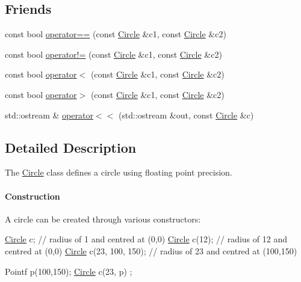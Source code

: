 \subsection*{Friends}
\begin{DoxyCompactItemize}
\item 
const bool \hyperlink{classprism_1_1geometry_1_1_circle_aea4bcef75428f13320f5c8148869d7ac}{operator==} (const \hyperlink{classprism_1_1geometry_1_1_circle}{Circle} \&c1, const \hyperlink{classprism_1_1geometry_1_1_circle}{Circle} \&c2)
\item 
const bool \hyperlink{classprism_1_1geometry_1_1_circle_ac1093de6b8dac6c9df82db5b72148634}{operator!=} (const \hyperlink{classprism_1_1geometry_1_1_circle}{Circle} \&c1, const \hyperlink{classprism_1_1geometry_1_1_circle}{Circle} \&c2)
\item 
const bool \hyperlink{classprism_1_1geometry_1_1_circle_a3aaa7d08426b0e4aa5f51f1839eb3bb1}{operator$<$} (const \hyperlink{classprism_1_1geometry_1_1_circle}{Circle} \&c1, const \hyperlink{classprism_1_1geometry_1_1_circle}{Circle} \&c2)
\item 
const bool \hyperlink{classprism_1_1geometry_1_1_circle_a519af3a911c5ccd13d0c711d0adfef79}{operator$>$} (const \hyperlink{classprism_1_1geometry_1_1_circle}{Circle} \&c1, const \hyperlink{classprism_1_1geometry_1_1_circle}{Circle} \&c2)
\item 
std\+::ostream \& \hyperlink{classprism_1_1geometry_1_1_circle_a4deb656103c2fc1ea9258fc37bfdcc6c}{operator$<$$<$} (std\+::ostream \&out, const \hyperlink{classprism_1_1geometry_1_1_circle}{Circle} \&c)
\end{DoxyCompactItemize}


\subsection{Detailed Description}
The \hyperlink{classprism_1_1geometry_1_1_circle}{Circle} class defines a circle using floating point precision.

\paragraph*{Construction}

A circle can be created through various constructors\+:


\begin{DoxyCode}
\hyperlink{classprism_1_1geometry_1_1_circle_a7d9e34947cf139b50f5730ed7711b4a4}{Circle} c; \textcolor{comment}{// radius of 1 and centred at (0,0)}
\hyperlink{classprism_1_1geometry_1_1_circle_a7d9e34947cf139b50f5730ed7711b4a4}{Circle} c(12); \textcolor{comment}{// radius of 12 and centred at (0,0)}
\hyperlink{classprism_1_1geometry_1_1_circle_a7d9e34947cf139b50f5730ed7711b4a4}{Circle} c(23, 100, 150); \textcolor{comment}{// radius of 23 and centred at (100,150)}

Pointf p(100,150);
\hyperlink{classprism_1_1geometry_1_1_circle_a7d9e34947cf139b50f5730ed7711b4a4}{Circle} c(23, p) ;
\end{DoxyCode}


